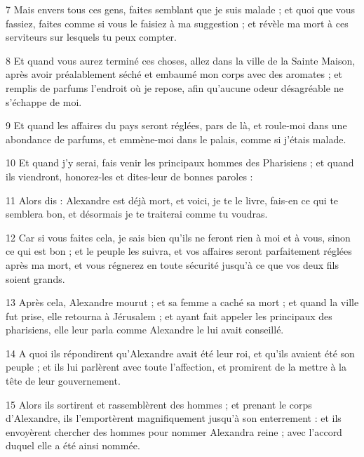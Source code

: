 \par 7 Mais envers tous ces gens, faites semblant que je suis malade ; et quoi que vous fassiez, faites comme si vous le faisiez à ma suggestion ; et révèle ma mort à ces serviteurs sur lesquels tu peux compter.

\par 8 Et quand vous aurez terminé ces choses, allez dans la ville de la Sainte Maison, après avoir préalablement séché et embaumé mon corps avec des aromates ; et remplis de parfums l'endroit où je repose, afin qu'aucune odeur désagréable ne s'échappe de moi.

\par 9 Et quand les affaires du pays seront réglées, pars de là, et roule-moi dans une abondance de parfums, et emmène-moi dans le palais, comme si j'étais malade.

\par 10 Et quand j'y serai, fais venir les principaux hommes des Pharisiens ; et quand ils viendront, honorez-les et dites-leur de bonnes paroles :

\par 11 Alors dis : Alexandre est déjà mort, et voici, je te le livre, fais-en ce qui te semblera bon, et désormais je te traiterai comme tu voudras.

\par 12 Car si vous faites cela, je sais bien qu'ils ne feront rien à moi et à vous, sinon ce qui est bon ; et le peuple les suivra, et vos affaires seront parfaitement réglées après ma mort, et vous régnerez en toute sécurité jusqu'à ce que vos deux fils soient grands.

\par 13 Après cela, Alexandre mourut ; et sa femme a caché sa mort ; et quand la ville fut prise, elle retourna à Jérusalem ; et ayant fait appeler les principaux des pharisiens, elle leur parla comme Alexandre le lui avait conseillé.

\par 14 A quoi ils répondirent qu'Alexandre avait été leur roi, et qu'ils avaient été son peuple ; et ils lui parlèrent avec toute l'affection, et promirent de la mettre à la tête de leur gouvernement.

\par 15 Alors ils sortirent et rassemblèrent des hommes ; et prenant le corps d'Alexandre, ils l'emportèrent magnifiquement jusqu'à son enterrement : et ils envoyèrent chercher des hommes pour nommer Alexandra reine ; avec l'accord duquel elle a été ainsi nommée.

